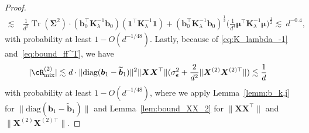 \documentclass[twoside,11pt]{article}
\newcommand{\bepsilon}{\boldsymbol{\epsilon}}
\newcommand{\diag}{\text{diag}}
\def\bK{{\boldsymbol K}}
\def\bX{{\boldsymbol X}}
\def\bb{{\boldsymbol b}}
\def\bSigma{{\boldsymbol \Sigma}}
\renewcommand{\bK}{\boldsymbol{K}}
\newcommand{\Tr}{\operatorname{Tr}}
\newcommand{\vmu}{\mbi{\mu}}
\newcommand{\mix}{\textnormal{mix}}
\newcommand{\1}{\mathbf{1}}
\def\mbi#1{\boldsymbol{#1}}
\def\mbi#1{\boldsymbol{#1}} %
\begin{document}
\begin{proof}
\begin{align}
\lesssim~&  \frac{1}{d^2}\Tr(\bSigma^2)\cdot(\bb_0^\top\bK_{\lambda}^{-1}\bb_0)(\1^\top\bK_{\lambda}^{-1}\1) +(\bb_0^\top\bK_{\lambda}^{-1}\bb_0)^{\frac{1}{2}}\big(\frac{1}{d^4}\vmu^\top\bK_{\lambda}^{-1}\vmu\big)^{\frac{1}{2}} 
\lesssim~ d^{-0.4},
\end{align} 
with probability at least $1-O(d^{-1/48})$. Lastly, because of \eqref{eq:K_lambda_-1} and~\eqref{eq:bound_ff^T}, we have
\begin{align}
    |\cR_{\mix}^{(2)}|\lesssim ~& d \cdot \|\diag(\bb_1-\widetilde\bb_1)\|^2\|\bX\bX^\top\|(\sigma^2_{\bepsilon}+\frac{2}{d^2} \|\bX^{(2)} \bX^{(2)\top}\|)
    \lesssim \frac{1}{d}
\end{align}
with probability at least $1-O(d^{-1/48})$, where we apply Lemma~\ref{lemm:b_k,i} for $\|\diag(\bb_1-\widetilde\bb_1)\|$ and Lemma~\ref{lem:bound_XX_2} for $\|\bX\bX^\top\|$ and $\|\bX^{(2)} \bX^{(2)\top}\|$.
\end{proof}
\end{document}
